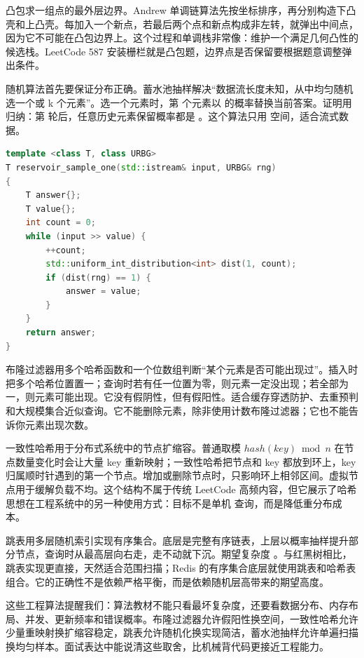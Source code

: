 凸包求一组点的最外层边界。Andrew 单调链算法先按坐标排序，再分别构造下凸壳和上凸壳。每加入一个新点，若最后两个点和新点构成非左转，就弹出中间点，因为它不可能在凸包边界上。这个过程和单调栈非常像：维护一个满足几何凸性的候选栈。LeetCode 587 安装栅栏就是凸包题，边界点是否保留要根据题意调整弹出条件。

随机算法首先要保证分布正确。蓄水池抽样解决“数据流长度未知，从中均匀随机选一个或 k 个元素”。选一个元素时，第  个元素以  的概率替换当前答案。证明用归纳：第  轮后，任意历史元素保留概率都是 。这个算法只用  空间，适合流式数据。

\begin{lstlisting}[language=C++,caption={蓄水池抽样：数据流中均匀选择一个元素}]
template <class T, class URBG>
T reservoir_sample_one(std::istream& input, URBG& rng)
{
    T answer{};
    T value{};
    int count = 0;
    while (input >> value) {
        ++count;
        std::uniform_int_distribution<int> dist(1, count);
        if (dist(rng) == 1) {
            answer = value;
        }
    }
    return answer;
}
\end{lstlisting}

布隆过滤器用多个哈希函数和一个位数组判断“某个元素是否可能出现过”。插入时把多个哈希位置置一；查询时若有任一位置为零，则元素一定没出现；若全部为一，则元素可能出现。它没有假阴性，但有假阳性。适合缓存穿透防护、去重预判和大规模集合近似查询。它不能删除元素，除非使用计数布隆过滤器；它也不能告诉你元素出现次数。

一致性哈希用于分布式系统中的节点扩缩容。普通取模 $hash(key) \bmod n$ 在节点数量变化时会让大量 key 重新映射；一致性哈希把节点和 key 都放到环上，key 归属顺时针遇到的第一个节点。增加或删除节点时，只影响环上相邻区间。虚拟节点用于缓解负载不均。这个结构不属于传统 LeetCode 高频内容，但它展示了哈希思想在工程系统中的另一种使用方式：目标不是单机  查询，而是降低重分布成本。

跳表用多层随机索引实现有序集合。底层是完整有序链表，上层以概率抽样提升部分节点，查询时从最高层向右走，走不动就下沉。期望复杂度 。与红黑树相比，跳表实现更直接，天然适合范围扫描；Redis 的有序集合底层就使用跳表和哈希表组合。它的正确性不是依赖严格平衡，而是依赖随机层高带来的期望高度。

这些工程算法提醒我们：算法教材不能只看最坏复杂度，还要看数据分布、内存布局、并发、更新频率和错误概率。布隆过滤器允许假阳性换空间，一致性哈希允许少量重映射换扩缩容稳定，跳表允许随机化换实现简洁，蓄水池抽样允许单遍扫描换均匀样本。面试表达中能说清这些取舍，比机械背代码更接近工程能力。


